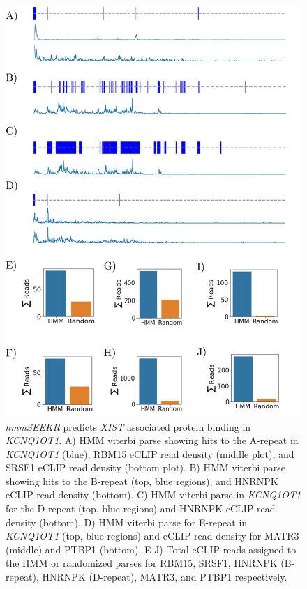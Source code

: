 \begin{figure}[h!]
\centering
\includegraphics[width=.92\textwidth]{images/kcneclip.pdf}
\caption[Analysis of HMM and eCLIP data in \emph{KCNQ1OT1}]{\emph{hmmSEEKR} predicts \emph{XIST} associated protein binding in \emph{KCNQ1OT1}. A) HMM viterbi parse showing hits to the A-repeat in \emph{KCNQ1OT1} (blue), RBM15 eCLIP read density (middle plot), and SRSF1 eCLIP read density (bottom plot). B) HMM viterbi parse showing hits to the B-repeat (top, blue regions), and HNRNPK eCLIP read density (bottom). C) HMM viterbi parse in \emph{KCNQ1OT1} for the D-repeat (top, blue regions) and HNRNPK eCLIP read density (bottom). D) HMM viterbi parse for E-repeat in \emph{KCNQ1OT1} (top, blue regions) and eCLIP read density for MATR3 (middle) and PTBP1 (bottom). E-J) Total eCLIP reads assigned to the HMM or randomized parses for RBM15, SRSF1, HNRNPK (B-repeat), HNRNPK (D-repeat), MATR3, and PTBP1 respectively. }
\label{fig:kcntracks}
\end{figure}


